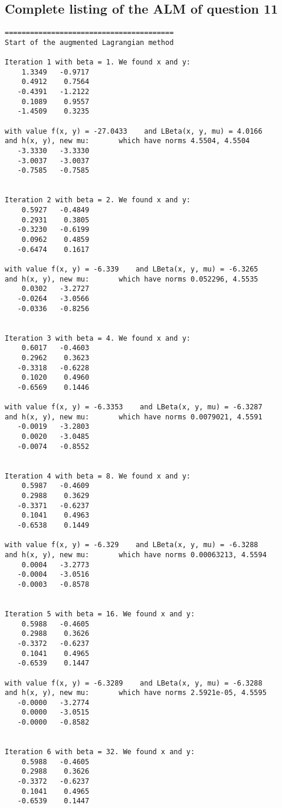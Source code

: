 \documentclass{article}
\begin{document}
\subsection*{Complete listing of the ALM of question 11}
\begin{lstlisting}
========================================
Start of the augmented Lagrangian method

Iteration 1 with beta = 1. We found x and y:
    1.3349   -0.9717
    0.4912    0.7564
   -0.4391   -1.2122
    0.1089    0.9557
   -1.4509    0.3235

with value f(x, y) = -27.0433    and LBeta(x, y, mu) = 4.0166
and h(x, y), new mu:       which have norms 4.5504, 4.5504
   -3.3330   -3.3330
   -3.0037   -3.0037
   -0.7585   -0.7585


Iteration 2 with beta = 2. We found x and y:
    0.5927   -0.4849
    0.2931    0.3805
   -0.3230   -0.6199
    0.0962    0.4859
   -0.6474    0.1617

with value f(x, y) = -6.339    and LBeta(x, y, mu) = -6.3265
and h(x, y), new mu:       which have norms 0.052296, 4.5535
    0.0302   -3.2727
   -0.0264   -3.0566
   -0.0336   -0.8256


Iteration 3 with beta = 4. We found x and y:
    0.6017   -0.4603
    0.2962    0.3623
   -0.3318   -0.6228
    0.1020    0.4960
   -0.6569    0.1446

with value f(x, y) = -6.3353    and LBeta(x, y, mu) = -6.3287
and h(x, y), new mu:       which have norms 0.0079021, 4.5591
   -0.0019   -3.2803
    0.0020   -3.0485
   -0.0074   -0.8552


Iteration 4 with beta = 8. We found x and y:
    0.5987   -0.4609
    0.2988    0.3629
   -0.3371   -0.6237
    0.1041    0.4963
   -0.6538    0.1449

with value f(x, y) = -6.329    and LBeta(x, y, mu) = -6.3288
and h(x, y), new mu:       which have norms 0.00063213, 4.5594
    0.0004   -3.2773
   -0.0004   -3.0516
   -0.0003   -0.8578


Iteration 5 with beta = 16. We found x and y:
    0.5988   -0.4605
    0.2988    0.3626
   -0.3372   -0.6237
    0.1041    0.4965
   -0.6539    0.1447

with value f(x, y) = -6.3289    and LBeta(x, y, mu) = -6.3288
and h(x, y), new mu:       which have norms 2.5921e-05, 4.5595
   -0.0000   -3.2774
    0.0000   -3.0515
   -0.0000   -0.8582


Iteration 6 with beta = 32. We found x and y:
    0.5988   -0.4605
    0.2988    0.3626
   -0.3372   -0.6237
    0.1041    0.4965
   -0.6539    0.1447


\end{lstlisting}
\end{document}
